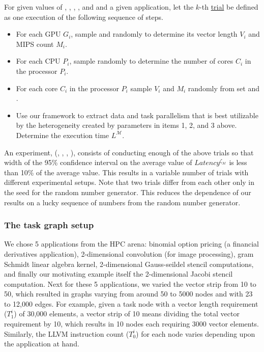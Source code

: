 For given values of \numtplgynodes, \gpunum, \veclenset, \corenumset,
and \mipsset and a given application, let the $k$-th \ul{trial} be
defined as one execution of the following sequence of steps.

\begin{itemize}

\item For each GPU $G_i$, sample \veclenset and \mipsset randomly to
  determine its vector length $V_i$ and MIPS count $M_i$. \label{i1}

\item For each CPU $P_i$, sample \corenumset randomly to determine the
  number of cores $C_i$ in the processor $P_i$.~\label{i2}

\item For each core $C_i$ in the processor $P_i$ sample $V_i$ and $M_i$
  randomly from set \veclenset and \mipsset.

\item Use our framework to extract data and task parallelism that is
  best utilizable by the heterogeneity created by parameters in items 1,
  2, and 3 above. Determine the execution time
  $L^{\mathcal{M}}$.

\end{itemize}

An experiment, \expt(\numtplgynodes, \gpunum, \veclenset, \corenumset
\mipsset), consists of conducting enough of the above trials so that
width of the 95\% confidence interval on the average value of
$Latency^{\zeta_\mathcal{M}}$ is less than 10\% of the average
value. This results in a variable number of trials with different
experimental setups. Note that two trials differ from each other only in
the seed for the random number generator.  This reduces the dependence
of our results on a lucky sequence of numbers from the random number
generator.

\subsubsection{The task graph setup}
\label{sec:task-graph-setup}

We chose 5 applications from the HPC arena: binomial option pricing (a
financial derivatives application), 2-dimensional convolution (for image
processing), gram Schmidt linear algebra kernel, 2-dimensional
Gauss-seildel stencil computations, and finally our motivating example
itself the 2-dimensional Jacobi stencil computation. Next for these 5
applications, we varied the vector strip from 10 to 50, which resulted
in graphs varying from around 50 to 5000 nodes and with 23 to 12,000
edges. For example, given a task node with a vector length requirement
($T^i_1$) of 30,000 elements, a vector strip of 10 means dividing the
total vector requirement by 10, which results in 10 nodes each requiring
3000 vector elements. Similarly, the LLVM instruction count ($T^i_0$)
for each node varies depending upon the application at hand.

